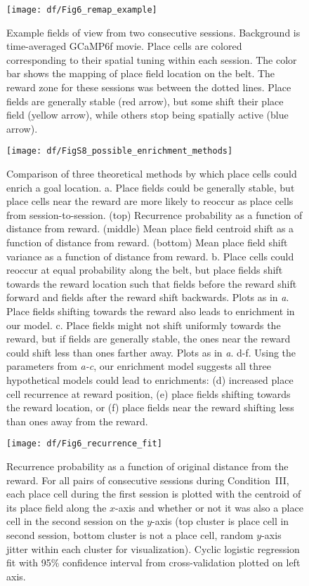 \begin{figure}
	\centering
	\texttt{[image: df/Fig6\_remap\_example]}
	\caption[Individual place field stability examples]{Example fields of view from two consecutive sessions. Background is time-averaged GCaMP6f movie. Place cells are colored corresponding to their spatial tuning within each session. The color bar shows the mapping of place field location on the belt. The reward zone for these sessions was between the dotted lines. Place fields are generally stable (red arrow), but some shift their place field (yellow arrow), while others stop being spatially active (blue arrow).}
	\label{fig:df:remap_example}
\end{figure}

\begin{figure}
	\centering
	\texttt{[image: df/FigS8\_possible\_enrichment\_methods]}
	\caption[Possible enrichment methods]{Comparison of three theoretical methods by which place cells could enrich a goal location.
	a. Place fields could be generally stable, but place cells near the reward are more likely to reoccur as place cells from session-to-session. (top) Recurrence probability as a function of distance from reward. (middle) Mean place field centroid shift as a function of distance from reward. (bottom) Mean place field shift variance as a function of distance from reward.
	b. Place cells could reoccur at equal probability along the belt, but place fields shift towards the reward location such that fields before the reward shift forward and fields after the reward shift backwards. Plots as in \emph{a}. Place fields shifting towards the reward also leads to enrichment in our model.
	c. Place fields might not shift uniformly towards the reward, but if fields are generally stable, the ones near the reward could shift less than ones farther away. Plots as in \emph{a}.
	d-f. Using the parameters from \emph{a-c}, our enrichment model suggests all three hypothetical models could lead to enrichments: (d) increased place cell recurrence at reward position, (e) place fields shifting towards the reward location, or (f) place fields near the reward shifting less than ones away from the reward.}
	\label{fig:df:possible_enrichment}
\end{figure}

\begin{figure}
	\centering
	\texttt{[image: df/Fig6\_recurrence\_fit]}
	\caption[Recurrence probability as a function of original distance from the reward]{Recurrence probability as a function of original distance from the reward. For all pairs of consecutive sessions during Condition~III, each place cell during the first session is plotted with the centroid of its place field along the $x$-axis and whether or not it was also a place cell in the second session on the $y$-axis (top cluster is place cell in second session, bottom cluster is not a place cell, random $y$-axis jitter within each cluster for visualization). Cyclic logistic regression fit with 95\% confidence interval from cross-validation plotted on left axis.}
	\label{fig:df:recurrence_fit}
\end{figure}

